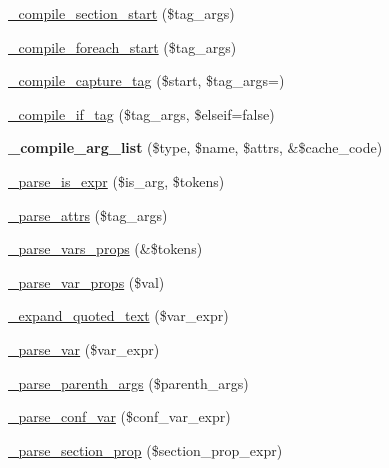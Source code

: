 \begin{DoxyCompactItemize}
\item 
\mbox{\hyperlink{class_smarty___compiler_ab1362bbbec0dd0376e46c46c7af6fe4e}{\+\_\+compile\+\_\+section\+\_\+start}} (\$tag\+\_\+args)
\item 
\mbox{\hyperlink{class_smarty___compiler_a84b4644d15ae71ec55412e8c26cd702b}{\+\_\+compile\+\_\+foreach\+\_\+start}} (\$tag\+\_\+args)
\item 
\mbox{\hyperlink{class_smarty___compiler_aa753b496a05ea7af01406f98c508edc9}{\+\_\+compile\+\_\+capture\+\_\+tag}} (\$start, \$tag\+\_\+args=\textquotesingle{}\textquotesingle{})
\item 
\mbox{\hyperlink{class_smarty___compiler_a75459b547539c23758a5e3c8128651b0}{\+\_\+compile\+\_\+if\+\_\+tag}} (\$tag\+\_\+args, \$elseif=false)
\item 
\mbox{\label{class_smarty___compiler_a706dfb0a042d70b407153241653da0c6}} 
{\bfseries \+\_\+compile\+\_\+arg\+\_\+list} (\$type, \$name, \$attrs, \&\$cache\+\_\+code)
\item 
\mbox{\hyperlink{class_smarty___compiler_ad03b182e7b84d4a40218ae9b4f8080de}{\+\_\+parse\+\_\+is\+\_\+expr}} (\$is\+\_\+arg, \$tokens)
\item 
\mbox{\hyperlink{class_smarty___compiler_a226e4f37cafc2d535b3ea7ccad565d6a}{\+\_\+parse\+\_\+attrs}} (\$tag\+\_\+args)
\item 
\mbox{\hyperlink{class_smarty___compiler_a2ab9cbfebcdbc2807c684de842278295}{\+\_\+parse\+\_\+vars\+\_\+props}} (\&\$tokens)
\item 
\mbox{\hyperlink{class_smarty___compiler_a7925236cb19a53ba4fb17ff51f164eb9}{\+\_\+parse\+\_\+var\+\_\+props}} (\$val)
\item 
\mbox{\hyperlink{class_smarty___compiler_ad242e9af4f6ee1524acdca2ee529f87a}{\+\_\+expand\+\_\+quoted\+\_\+text}} (\$var\+\_\+expr)
\item 
\mbox{\hyperlink{class_smarty___compiler_aeeaa2b6e8325e1aa932d45a189e8bce6}{\+\_\+parse\+\_\+var}} (\$var\+\_\+expr)
\item 
\mbox{\hyperlink{class_smarty___compiler_a77a6bbc6a17e76b941c3cefeee9c7b2d}{\+\_\+parse\+\_\+parenth\+\_\+args}} (\$parenth\+\_\+args)
\item 
\mbox{\hyperlink{class_smarty___compiler_a3887c9771f60165babae612a4595d1fc}{\+\_\+parse\+\_\+conf\+\_\+var}} (\$conf\+\_\+var\+\_\+expr)
\item 
\mbox{\hyperlink{class_smarty___compiler_a4509a57efd495c63579f7447c2d28972}{\+\_\+parse\+\_\+section\+\_\+prop}} (\$section\+\_\+prop\+\_\+expr)

\end{DoxyCompactItemize}
